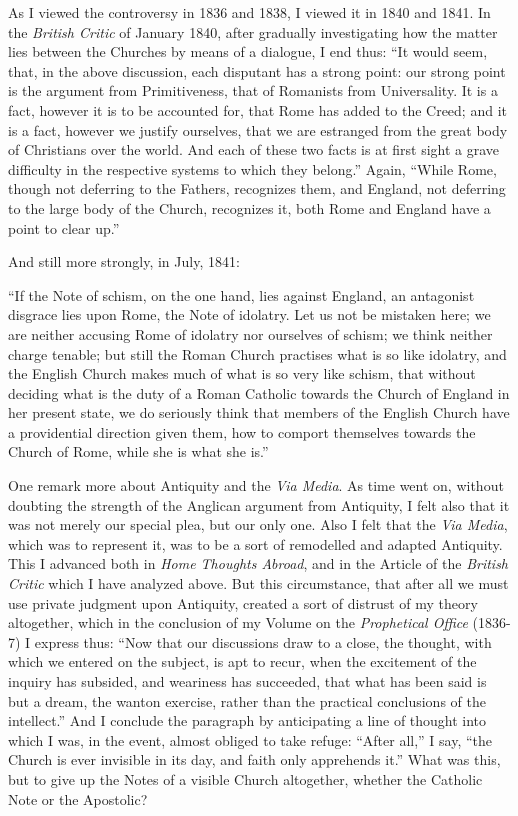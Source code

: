As I viewed the controversy in 1836 and 1838, I viewed it in 1840 and
1841. In the \emph{British Critic} of January 1840, after gradually
investigating how the matter lies between the Churches by means of a
dialogue, I end thus: ``It would seem, that, in the above
discussion, each disputant has a strong point: our strong point is the
argument from Primitiveness, that of Romanists from Universality. It is
a fact, however it is to be accounted for, that Rome has added to the
Creed; and it is a fact, however we justify ourselves, that we are
estranged from the great body of Christians over the world. And each of
these two facts is at first sight a grave difficulty in the respective
systems to which they belong.'' Again, ``While Rome, though not
deferring to the Fathers, recognizes them, and England, not deferring to
the large body of the Church, recognizes it, both Rome and England have
a point to clear up.''

And still more strongly, in July, 1841:

``If the Note of schism, on the one hand, lies against England,
an antagonist disgrace lies upon Rome, the Note of idolatry. Let us not
be mistaken here; we are neither accusing Rome of idolatry nor
ourselves of schism; we think neither charge tenable; but still the
Roman Church practises what is so like idolatry, and the English Church
makes much of what is so very like schism, that without deciding what is
the duty of a Roman Catholic towards the Church of England in her
present state, we do seriously think that members of the English Church
have a providential direction given them, how to comport themselves
towards the Church of Rome, while she is what she is.''

One remark more about Antiquity and the \emph{Via Media}. As time
went on, without doubting the strength of the Anglican argument from
Antiquity, I felt also that it was not merely our special plea, but our
only one. Also I felt that the \emph{Via Media}, which was to represent
it, was to be a sort of remodelled and adapted Antiquity. This I
advanced both in \emph{Home Thoughts Abroad}, and in the Article of the
\emph{British Critic}
which I have analyzed above. But this circumstance, that after all
we must use private judgment upon Antiquity, created a sort of distrust
of my theory altogether, which in the conclusion of my Volume on the \emph{Prophetical Office} (1836-7) I express thus: ``Now that our
discussions draw to a close, the thought, with which we entered on the
subject, is apt to recur, when the excitement of the inquiry has
subsided, and weariness has succeeded, that what has been said is but a
dream, the wanton exercise, rather than the practical conclusions of the
intellect.'' And I conclude the paragraph by anticipating a line of
thought into which I was, in the event, almost obliged to take refuge:
``After all,'' I say, ``the Church is ever invisible in its
day, and faith only apprehends it.'' What was this, but to give up
the Notes of a visible Church altogether, whether the Catholic Note or
the Apostolic?

